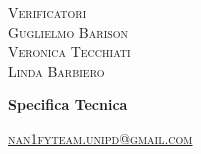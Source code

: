 \documentclass[8pt]{article}
\begin{document}
\begin{titlepage}
\begin{minipage}[t]{0.47\textwidth}
		{\large{\textsc{Verificatori}}
			\vspace{3mm}
			{\\\large{\textsc{Guglielmo Barison}\\}} 
			{\large{\textsc{Veronica Tecchiati}\\}} 
			{\large{\textsc{Linda Barbiero}\\}}
			
		}
		\vspace{2mm}\vspace{2mm}
	\end{minipage}
	\vspace{4cm}
	\begin{center}
		\begin{flushright}
			{\fontsize{30pt}{52pt}\selectfont \textbf{Specifica Tecnica}} %
		\end{flushright}
		\vspace{3cm}
	\end{center}
	\vspace{10 cm}
	{\small \textsc{\href{mailto: nan1fyteam.unipd@gmail.com}{nan1fyteam.unipd@gmail.com}}}
\end{titlepage}
\pagestyle{mystyle}
\end{document}
